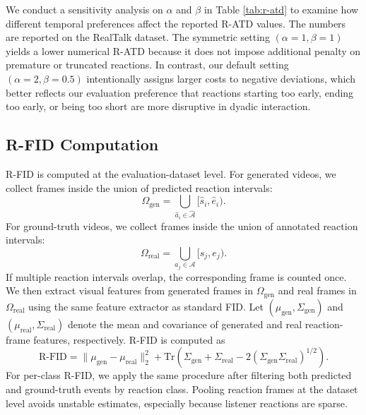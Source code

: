 We conduct a sensitivity analysis on $\alpha$ and $\beta$ in Table \ref{tab:r-atd} to examine how different temporal preferences affect the reported R-ATD values. The numbers are reported on the RealTalk dataset. The symmetric setting $(\alpha=1,\beta=1)$ yields a lower numerical R-ATD because it does not impose additional penalty on premature or truncated reactions. In contrast, our default setting $(\alpha=2,\beta=0.5)$ intentionally assigns larger costs to negative deviations, which better reflects our evaluation preference that reactions starting too early, ending too early, or being too short are more disruptive in dyadic interaction.

\subsection{R-FID Computation}
\label{app:rfid_computation}

R-FID \cite{Seitzer2020FID} is computed at the evaluation-dataset level. For generated videos, we collect frames inside the union of predicted reaction intervals:
\begin{equation}
    \Omega_{\mathrm{gen}}=\bigcup_{\widehat{a}_i\in\widehat{\mathcal{A}}}[\widehat{s}_i,\widehat{e}_i).
\end{equation}
For ground-truth videos, we collect frames inside the union of annotated reaction intervals:
\begin{equation}
    \Omega_{\mathrm{real}}=\bigcup_{a_j\in\mathcal{A}}[s_j,e_j).
\end{equation}
If multiple reaction intervals overlap, the corresponding frame is counted once. We then extract visual features from generated frames in $\Omega_{\mathrm{gen}}$ and real frames in $\Omega_{\mathrm{real}}$ using the same feature extractor as standard FID. Let $(\mu_{\mathrm{gen}},\Sigma_{\mathrm{gen}})$ and $(\mu_{\mathrm{real}},\Sigma_{\mathrm{real}})$ denote the mean and covariance of generated and real reaction-frame features, respectively. R-FID is computed as
\begin{equation}
    \mathrm{R\text{-}FID}=
    \|\mu_{\mathrm{gen}}-\mu_{\mathrm{real}}\|_2^2+
    \mathrm{Tr}\left(\Sigma_{\mathrm{gen}}+\Sigma_{\mathrm{real}}-2(\Sigma_{\mathrm{gen}}\Sigma_{\mathrm{real}})^{1/2}\right).
\end{equation}
For per-class R-FID, we apply the same procedure after filtering both predicted and ground-truth events by reaction class. Pooling reaction frames at the dataset level avoids unstable estimates, especially because listener reactions are sparse.